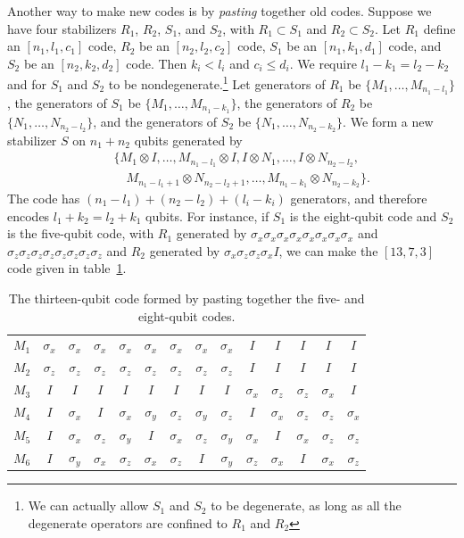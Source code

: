 \documentclass{report}
\newcommand{\X}{\sigma_x}
\newcommand{\Z}{\sigma_z}
\newcommand{\Y}{\sigma_y}
\begin{document}
Another way to make new codes is by {\em pasting} together old codes.  Suppose 
we have four stabilizers $R_1$, $R_2$, $S_1$, and $S_2$, with $R_1 \subset 
S_1$ and $R_2 \subset S_2$.  Let $R_1$ define an $[n_1, l_1, c_1]$ code, 
$R_2$ be an $[n_2, l_2, c_2]$ code, $S_1$ be an $[n_1, k_1, d_1]$ code, and 
$S_2$ be an $[n_2, k_2, d_2]$ code.  Then $k_i < l_i$ and $c_i \leq d_i$.  We 
require $l_1-k_1 = l_2-k_2$ and for $S_1$ and $S_2$ to be 
nondegenerate.\footnote{We can actually allow $S_1$ and $S_2$ to be degenerate, 
as long as all the degenerate operators are confined to $R_1$ and $R_2$}  Let 
generators of $R_1$ be $\{M_1, \ldots, M_{n_1 - l_1}\}$, the generators of 
$S_1$ be $\{M_1, \ldots, M_{n_1-k_1}\}$, the generators of $R_2$ be $\{N_1, 
\ldots, N_{n_2-l_2}\}$, and the generators of $S_2$ be $\{N_1, \ldots, 
N_{n_2-k_2}\}$.  We form a new stabilizer $S$ on $n_1 + n_2$ qubits generated 
by 
\begin{eqnarray}
& & \{M_1 \otimes I, \ldots, M_{n_1-l_1} \otimes I, I \otimes N_1, \ldots, 
I \otimes N_{n_2-l_2}, \nonumber \\
& & \quad M_{n_1-l_1+1} \otimes N_{n_2-l_2+1}, \ldots,
M_{n_1-k_1} \otimes N_{n_2-k_2} \}.
\end{eqnarray}
The code has $(n_1-l_1) + (n_2-l_2) + (l_i-k_i)$ generators, and therefore 
encodes $l_1+k_2 = l_2+k_1$ qubits.  For instance, if $S_1$ is the eight-qubit 
code and $S_2$ is the five-qubit code, with $R_1$ generated by $\X \X \X \X 
\X \X \X \X$ and $\Z \Z \Z \Z \Z \Z \Z \Z$ and $R_2$ generated by $\X \Z 
\Z \X I$, we can make the $[13,7,3]$ code given in 
table~\ref{table-13qubit}.
\begin{table}
\centering
\begin{tabular}{c|cccccccc|ccccc}
$M_1$ & $\X$ & $\X$ & $\X$ & $\X$ & $\X$ & $\X$ & $\X$ & $\X$ & $I$ 
& $I$ & $I$ & $I$ & $I$ \\
$M_2$ & $\Z$ & $\Z$ & $\Z$ & $\Z$ & $\Z$ & $\Z$ & $\Z$ & $\Z$ & $I$ & 
$I$ & $I$ & $I$ & $I$ \\
\hline
$M_3$ & $I$ & $I$ & $I$ & $I$ & $I$ & $I$ & $I$ & $I$ & $\X$ & $\Z$ & 
$\Z$ & $\X$ & $I$ \\
\hline
$M_4$ & $I$ & $\X$ & $I$ & $\X$ & $\Y$ & $\Z$ & $\Y$ & $\Z$ & $I$ & 
$\X$ & $\Z$ & $\Z$ & $\X$ \\
$M_5$ & $I$ & $\X$ & $\Z$ & $\Y$ & $I$ & $\X$ & $\Z$ & $\Y$ & $\X$ & 
$I$ & $\X$ & $\Z$ & $\Z$ \\
$M_6$ & $I$ & $\Y$ & $\X$ & $\Z$ & $\X$ & $\Z$ & $I$ & $\Y$ & $\Z$ & 
$\X$ & $I$ & $\X$ & $\Z$
\end{tabular}
\caption{The thirteen-qubit code formed by pasting together the five- and 
eight-qubit codes.}
\label{table-13qubit}
\end{table}
\end{document}
